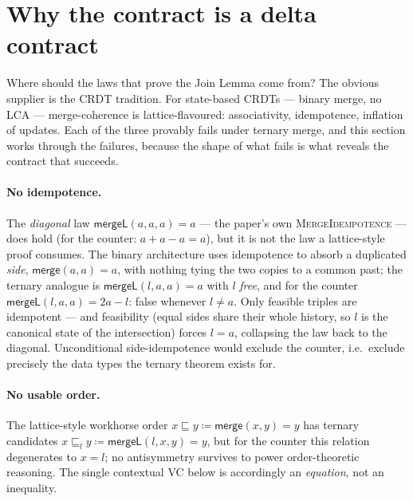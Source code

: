 \documentclass[11pt]{article}
\newcommand{\Merge}{\mathsf{merge}}
\newcommand{\mergeL}{\mathsf{mergeL}}
\begin{document}
\section{Why the contract is a delta contract}
\label{sec:whydelta}

Where should the laws that prove the Join Lemma come from? The obvious
supplier is the CRDT tradition. For state-based CRDTs --- binary merge,
no LCA --- merge-coherence is lattice-flavoured: associativity,
idempotence, inflation of updates. Each of the three provably fails
under ternary merge, and this section works through the failures,
because the shape of what fails is what reveals the contract that
succeeds.

\paragraph{No idempotence.} The \emph{diagonal} law
$\mergeL(a,a,a) = a$ --- the paper's own \textsc{MergeIdempotence} ---
does hold (for the counter: $a + a - a = a$), but it is not the law a
lattice-style proof consumes. The binary architecture uses idempotence
to absorb a duplicated \emph{side}, $\Merge(a,a) = a$, with nothing
tying the two copies to a common past; the ternary analogue is
$\mergeL(l,a,a) = a$ with $l$ \emph{free}, and for the counter
$\mergeL(l,a,a) = 2a - l$: false whenever $l \neq a$. Only feasible
triples are idempotent --- and feasibility (equal sides share their
whole history, so $l$ is the canonical state of the intersection)
forces $l = a$, collapsing the law back to the diagonal. Unconditional
side-idempotence would exclude the counter, i.e.\ exclude precisely the
data types the ternary theorem exists for.

\paragraph{No usable order.} The lattice-style workhorse order
$x \sqsubseteq y \coloneqq \Merge(x,y) = y$ has ternary candidates
$x \sqsubseteq_l y \coloneqq \mergeL(l,x,y) = y$, but for the counter this
relation degenerates to $x = l$; no antisymmetry survives to power
order-theoretic reasoning. The single
contextual VC below is accordingly an \emph{equation}, not an inequality.
\end{document}
